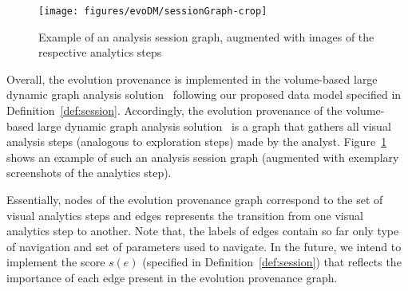 \begin{figure}[t]
	\center
	\texttt{[image: figures/evoDM/sessionGraph-crop]}
			\caption{Example of an analysis session graph, augmented with images of the respective analytics steps~\cite{Bruder2019}}
			\label{fig:expo-session}
\end{figure}
{\color{Fuchsia}Overall, the evolution provenance is implemented in the volume-based large dynamic graph analysis solution~\cite{Bruder2019} following our proposed data model specified in Definition~\ref{def:session}.
Accordingly, the evolution provenance of the volume-based large dynamic graph analysis solution~\cite{Bruder2019} is a graph that gathers all visual analysis steps (analogous to exploration steps) made by the analyst. 
Figure~\ref{fig:expo-session} shows an example of such an analysis session graph (augmented with exemplary screenshots of the analytics step). }%

Essentially, nodes of the evolution provenance graph correspond to the set of visual analytics steps and edges represents the transition from one visual analytics step to another. %
Note that, the labels of edges contain so far only type of navigation and set of parameters used to navigate. In the future, we intend to implement the score $s(e)$ (specified in Definition~\ref{def:session}) that reflects the importance of each edge present in the evolution provenance graph.
